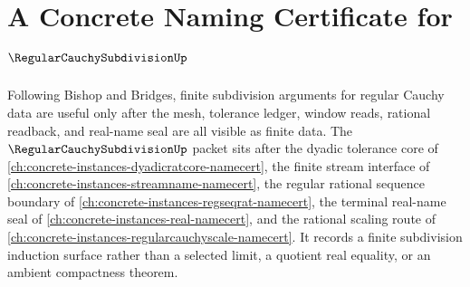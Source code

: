 \chapter{A Concrete Naming Certificate for $\RegularCauchySubdivisionUp$}
\label{ch:concrete-instances-regular-cauchy-subdivision-namecert}

Following Bishop and Bridges, finite subdivision arguments for regular Cauchy data are useful only after the mesh, tolerance ledger, window reads, rational readback, and real-name seal are all visible as finite data. The $\RegularCauchySubdivisionUp$ packet sits after the dyadic tolerance core of \autoref{ch:concrete-instances-dyadicratcore-namecert}, the finite stream interface of \autoref{ch:concrete-instances-streamname-namecert}, the regular rational sequence boundary of \autoref{ch:concrete-instances-regseqrat-namecert}, the terminal real-name seal of \autoref{ch:concrete-instances-real-namecert}, and the rational scaling route of \autoref{ch:concrete-instances-regularcauchyscale-namecert}. It records a finite subdivision induction surface rather than a selected limit, a quotient real equality, or an ambient compactness theorem.

